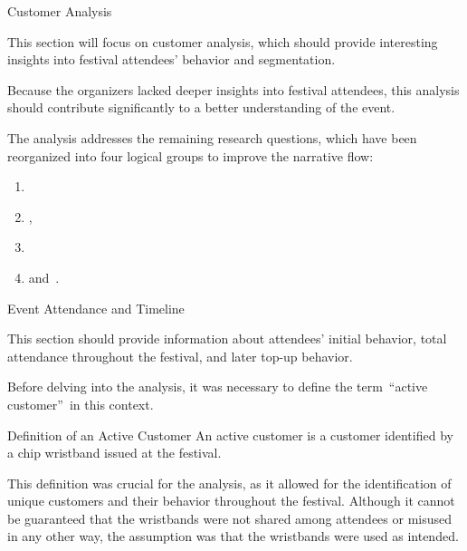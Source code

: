 \begin{section}{Customer Analysis}
	\label{sec:analysis-customers}

	This section will focus on customer analysis, which should provide interesting insights into festival attendees' behavior and segmentation.

	Because the organizers lacked deeper insights into festival attendees, this analysis should contribute significantly to a better understanding of the event.

	The analysis addresses the remaining research questions, which have been reorganized into four logical groups to improve the narrative flow:\\
	\begin{enumerate}
		\item {}
		\item {},
		\item {}
		\item and~.
	\end{enumerate}

	\begin{subsection}{Event Attendance and Timeline}
		\label{subsec:analysis-customer-event-attendance-timeline}

		This section should provide information about attendees' initial behavior, total attendance throughout the festival, and later top-up behavior.

		Before delving into the analysis, it was necessary to define the term~\enquote{active customer}~in this context.

		\begin{infobox}{Definition of an Active Customer}
			An active customer is a customer identified by a chip wristband issued at the festival.
		\end{infobox}

		This definition was crucial for the analysis, as it allowed for the identification of unique customers and their behavior throughout the festival.
		Although it cannot be guaranteed that the wristbands were not shared among attendees or misused in any other way, the assumption was that the wristbands were used as intended.


\end{subsection}
\end{section}
